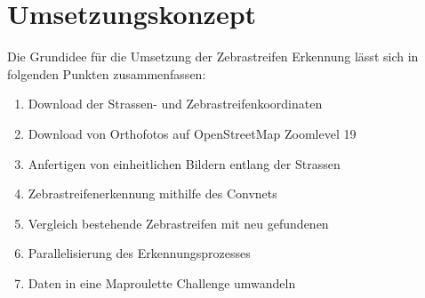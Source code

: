\section{Umsetzungskonzept}
Die Grundidee für die Umsetzung der Zebrastreifen Erkennung lässt sich in folgenden Punkten zusammenfassen:
\begin{enumerate}
	\item Download der Strassen- und Zebrastreifenkoordinaten
	\item Download von Orthofotos auf \Gls{OpenStreetMap} Zoomlevel 19
	\item Anfertigen von einheitlichen Bildern entlang der Strassen
	\item Zebrastreifenerkennung mithilfe des Convnets
	\item Vergleich bestehende Zebrastreifen mit neu gefundenen
	\item Parallelisierung des Erkennungsprozesses
	\item Daten in eine Maproulette Challenge umwandeln
\end{enumerate}








